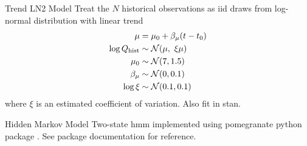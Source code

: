 \documentclass[
  10pt,     %
]{beamer}
\newcommand{\normal}{\mathcal{N}}
\begin{document}
\begin{frame}{Trend LN2 Model}
  Treat the $N$ historical observations as \gls{iid} draws from log-normal distribution with linear trend
  \begin{align}\label{eq:ln2-trend}
    \begin{split}
      \mu &= \mu_0 + \beta_\mu \qty(t - t_0) \\
    \log Q_\text{hist} & \sim \normal \qty(\mu, \ \xi \mu) \\
    \mu_0 & \sim \normal \qty(7, 1.5) \\
    \beta_\mu & \sim \normal \qty(0, 0.1) \\
    \log \xi & \sim \normal \qty(0.1, 0.1)
    \end{split}
  \end{align}
  where $\xi$ is an estimated coefficient of variation.
  Also fit in stan.
\end{frame}

\begin{frame}{Hidden Markov Model}
  Two-state \gls{hmm} \citep[see][]{Rabiner:1986jk} implemented using pomegranate python package \citep{Schreiber:2017tg}.
  See package documentation for reference.
\end{frame}
\end{document}

